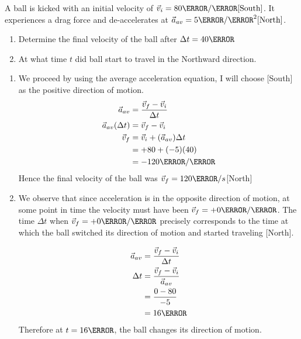 \documentclass[12pt]{article} %
\newcommand{\tx}[1]{\text{#1}}
\begin{document}
\begin{qstn}[5]
\begin{soln}
\begin{enumerate}[label = (\alph*)]
     \end{enumerate}

    \end{soln}

 \end{qstn}

\begin{qstn}[6]
 A ball is kicked with an initial velocity of $\vec v_i = 80 \m / \s \tx{[South]}$. It experiences a drag force and de-accelerates at $\vec a_{av} = 5 \m / \s^2 \tx{[North]}$.
            \begin{enumerate}[label = (\alph*)]
                \item Determine the final velocity of the ball after $\Delta t = 40\s$
                \item At what time $t$ did ball start to travel in the Northward direction.
            \end{enumerate}


    \begin{soln}
        \begin{enumerate}[label = (\alph*)]
            \item We proceed by using the average acceleration equation, I will choose [South] as the positive direction of motion. 
            \begin{align*}
                \vec a_{av} &= \frac{\vec v_f - \vec v_i}{\Delta t}\\
                \vec a_{av}(\Delta t) &= \vec v_f - \vec v_i \\
                \vec v_f &= \vec v_i + (\vec a_{av})\Delta t \\
                &= +80 + (-5)(40)\\
                &= -120 \m / \s
            \end{align*}
            Hence the final velocity of the ball was $\vec v_f = 120 \m / s$[North]


            \item We observe that since acceleration is in the opposite direction of motion, at some point in time the velocity must have been $\vec v_f = +0 \m / \s$. The time $\Delta t$ when $\vec v_f = +0 \m / \s$ precisely corresponds to the time at which the ball switched its direction of motion and started traveling [North].

            \begin{align*}
                \vec a_{av} &= \frac{\vec v_f - \vec v_i}{\Delta t}\\
                \Delta t &= \frac{\vec v_f - \vec v_i}{\vec a_{av}}\\
                &= \frac{0 - 80}{-5}\\
                &= 16\s
            \end{align*}
            Therefore at $t = 16\s$, the ball changes its direction of motion.

        \end{enumerate}

    \end{soln}


\end{qstn}
        
\end{document}
